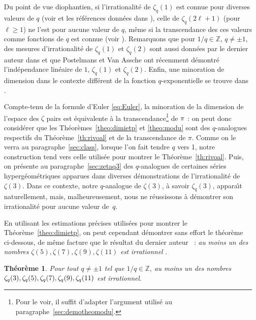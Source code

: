 \documentclass[12pt]{amsart}
\newtheorem{theo}{Th{\'e}or{\`e}me}
\theoremstyle{remark}
\numberwithin{equation}{section}
\begin{document}
Du point de vue diophantien, si l'irrationalit{\'e} de $\zeta_q(1)$ est connue pour diverses 
valeurs de $q$ (voir
\cite{bor} et
les r{\'e}f{\'e}rences donn{\'e}es dans \cite{zud1,zud4}),  celle 
de $\zeta_q(2\ell+1)$  
(pour $\ell\ge 1$) ne l'est pour
aucune valeur de $q$,      
m{\^e}me si la transcendance des ces valeurs 
comme fonctions de $q$ est connue (voir \cite{zud3}). 
Remarquons que pour 
$1/q\in\mathbb Z$, $q\ne\pm1$, des mesures d'irrationalit{\'e} de 
$\zeta_q(1)$ et $\zeta_q(2)$ sont aussi donn{\'e}es par le dernier
auteur dans 
\cite{zud4, zud2} et que Postelmans et Van Assche  \cite{postvan} ont r{\'e}cemment
d{\'e}montr{\'e} l'ind{\'e}pendance lin{\'e}aire de $1$, $\zeta_q(1)$ et $\zeta_q(2)$. 
Enfin, une minoration de dimension dans le contexte diff{\'e}rent 
de la fonction $q$-exponentielle se trouve dans \cite{buv}. 

Compte-tenu de la formule d'Euler \eqref{eq:Euler},
la minoration de la dimension de l'espace des $\zeta$ pairs est  
{\'e}quivalente 
{\`a} la transcendance\footnote{Pour le voir, il suffit d'adapter 
l'argument utilis{\'e} au paragraphe~\ref{sec:demotheomodu}.} de $\pi$~: on peut 
donc consid{\'e}rer que 
les Th{\'e}or{\`e}mes~\ref{theo:dimietp} et \ref{theo:modu} 
sont des $q$-analogues respectifs  du Th{\'e}or{\`e}me~\ref{th:rivoal}
et de la transcendance de $\pi$. 
Comme on le verra au paragraphe~\ref{sec:class}, 
lorsque l'on fait tendre $q$ vers 1, notre construction {\og tend
\fg} vers celle utilis{\'e}e pour montrer le 
Th{\'e}or{\`e}me~\ref{th:rivoal}. 
Puis, on pr{\'e}sente au paragraphe~\ref{sec:zetaq3} des 
$q$-analogues de certaines s{\'e}ries hyperg{\'e}om{\'e}triques 
apparues dans diverses 
d{\'e}monstrations de l'irrationalit{\'e} de $\zeta(3)$. Dans ce contexte, 
notre $q$-analogue de $\zeta(3)$, {\`a} savoir $\zeta_q(3)$, 
appara{\^\i}t naturellement, 
mais, malheureusement, nous ne r{\'e}ussissons {\`a} 
d{\'e}montrer son irrationalit{\'e} pour aucune valeur de~$q$. 

En utilisant les estimations pr{\'e}cises utilis{\'e}es pour montrer le  
Th{\'e}or{\`e}me~\ref{theo:dimietp},  on peut cependant d{\'e}mon\-trer sans effort le th{\'e}or{\`e}me
ci-dessous, de m{\^e}me facture que le r{\'e}sultat du dernier auteur 
\cite{zud0}~: {\it {\og au moins un des nombres $\zeta(5), \zeta(7), \zeta(9), \zeta(11)$ est
irrationnel \fg}}. 

\begin{theo} \label{theo:357911}
Pour tout $q\not =\pm1$ tel que $1/q\in\mathbb{Z}$, au moins un des
nombres $\zeta_q(3),\zeta_q(5),\break 
\zeta_q(7),\zeta_q(9),
\zeta_q(11)$ est irrationnel.
\end{theo}
\end{document}
